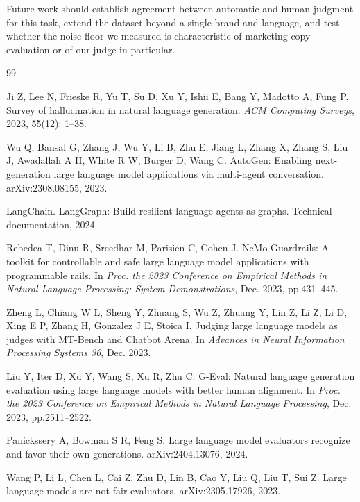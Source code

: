 \documentclass[9pt,twocolumn]{extarticle}
\begin{document}
Future work should establish agreement between automatic and human judgment
for this task, extend the dataset beyond a single brand and language, and test
whether the noise floor we measured is characteristic of marketing-copy
evaluation or of our judge in particular.

\balance

\begin{thebibliography}{99}
\footnotesize

Ji Z, Lee N, Frieske R, Yu T, Su D, Xu Y, Ishii E, Bang Y, Madotto A, Fung P.
Survey of hallucination in natural language generation. \textit{ACM Computing
Surveys}, 2023, 55(12): 1--38.

Wu Q, Bansal G, Zhang J, Wu Y, Li B, Zhu E, Jiang L, Zhang X, Zhang S, Liu J,
Awadallah A H, White R W, Burger D, Wang C. AutoGen: Enabling next-generation
large language model applications via multi-agent conversation. arXiv:2308.08155,
2023.

LangChain. LangGraph: Build resilient language agents as graphs. Technical
documentation, 2024.

Rebedea T, Dinu R, Sreedhar M, Parisien C, Cohen J. NeMo Guardrails: A toolkit
for controllable and safe large language model applications with programmable
rails. In \textit{Proc. the 2023 Conference on Empirical Methods in Natural
Language Processing: System Demonstrations}, Dec. 2023, pp.431--445.

Zheng L, Chiang W L, Sheng Y, Zhuang S, Wu Z, Zhuang Y, Lin Z, Li Z, Li D,
Xing E P, Zhang H, Gonzalez J E, Stoica I. Judging large language models as
judges with MT-Bench and Chatbot Arena. In \textit{Advances in Neural
Information Processing Systems 36}, Dec. 2023.

Liu Y, Iter D, Xu Y, Wang S, Xu R, Zhu C. G-Eval: Natural language generation
evaluation using large language models with better human alignment. In
\textit{Proc. the 2023 Conference on Empirical Methods in Natural Language
Processing}, Dec. 2023, pp.2511--2522.

Panickssery A, Bowman S R, Feng S. Large language model evaluators recognize
and favor their own generations. arXiv:2404.13076, 2024.

Wang P, Li L, Chen L, Cai Z, Zhu D, Lin B, Cao Y, Liu Q, Liu T, Sui Z. Large
language models are not fair evaluators. arXiv:2305.17926, 2023.


\end{thebibliography}
\end{document}
